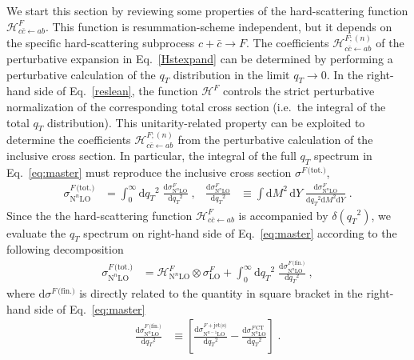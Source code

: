 \documentclass[12pt]{article}
\DeclareRobustCommand{\qt}{\ensuremath{q_T}\xspace}
\DeclareRobustCommand{\rd}{\ensuremath{\mathrm{d}}}
\DeclareRobustCommand{\cH}{\ensuremath{\mathcal{H}}}
\DeclareRobustCommand{\jets}{\text{jet(s)}\xspace}
\DeclareRobustCommand{\CT}{\text{CT}\xspace}
\DeclareRobustCommand{\fin}{\text{(fin.)}\xspace}
\DeclareRobustCommand{\tot}{\text{(tot.)}\xspace}
\DeclareRobustCommand{\LO}{\text{LO}\xspace}
\DeclareRobustCommand{\N}[1]{\ensuremath{\text{N}^{#1}}} %
\begin{document}
We start this section by reviewing some properties of the hard-scattering function $\cH_{c{\bar c} \gets ab}^{F}$. 
This function is resummation-scheme independent, but it depends on the specific hard-scattering subprocess $c + {\bar c} \to F$. 
The coefficients $\cH_{c{\bar c} \gets ab}^{F;(n)}$ of the perturbative expansion in Eq.~\eqref{Hstexpand} can be determined by performing a perturbative calculation of the $\qt$ distribution in the limit $\qt \to 0$. 
In the right-hand side of Eq.~\eqref{reslean}, the function $\cH^{F}$ controls the strict perturbative normalization of the corresponding total cross section (i.e.\ the integral of the total $\qt$ distribution). 
This unitarity-related property can be exploited to determine the coefficients $\cH_{c{\bar c} \gets ab}^{F ;(n)}$ from the perturbative calculation of the inclusive cross section.  
In particular, the integral of the full $\qt$ spectrum in Eq.~\eqref{eq:master} must reproduce the inclusive cross section $\sigma^{F\,\tot}$,
\begin{align}
  \sigma^{F\,\tot}_{\N{n}\LO}
  &=
  \int_0^\infty\rd\qt^2 \; \frac{\rd\sigma^{F}_{\N{n}\LO}}{\rd\qt^2} \;, 
  &
  \frac{\rd\sigma^{F}_{\N{n}\LO}}{\rd\qt^2}
  &\equiv
  \int\rd M^2 \, \rd Y \;
  \frac{\rd\sigma^{F}_{\N{n}\LO}}{\rd\qt^2\rd M^2\rd Y} \;.
  \label{restotp}
\end{align}
Since the the hard-scattering function $\cH_{c\bar{c}\gets ab}^{F}$ is accompanied by $\delta(\qt^{2})$, we evaluate the $\qt$ spectrum on right-hand side of Eq.~\eqref{eq:master} according to the following decomposition
\begin{align}
  \sigma^{F\,\tot}_{\N{n}\LO}
  &=
  \cH^F_{\N{n}\LO} \otimes \sigma^F_{\LO} + 
  \int_0^\infty\rd\qt^2 \; \frac{\rd\sigma^{F\,\fin}_{\N{n}\LO}}{\rd\qt^2} \;, 
  \label{sigtotrel} 
\end{align}
where $\rd{\sigma}^{F\,\fin}$ is directly related to the quantity in square bracket in the right-hand side of Eq.~\eqref{eq:master}
\begin{align}
  \frac{\rd\sigma^{F\,\fin}_{\N{n}\LO}}{\rd\qt^2}
  &\equiv
  \left[
    \frac{\rd\sigma^{F+\jets}_{\N{n-1}\LO}}{\rd\qt^2} -
    \frac{\rd\sigma^{F\,\CT}_{\N{n}\LO}}{\rd\qt^2} 
  \right]
  \; .
  \label{sigfin}
\end{align}
\end{document}
